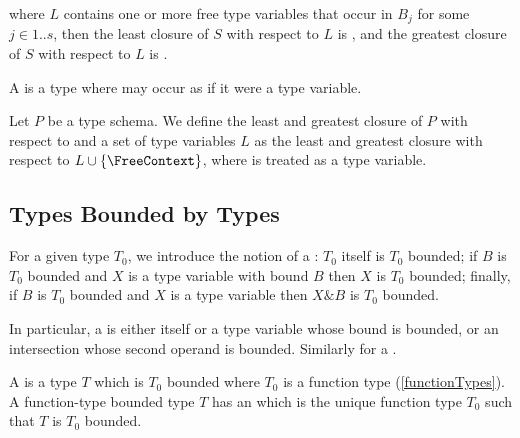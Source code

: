 \documentclass[makeidx]{article}
\begin{document}
\begin{itemize}
  \noindent

  \noindent

  \noindent
  where $L$ contains one or more free type variables that occur in $B_j$
  for some $j \in 1 .. s$,
  then the least closure of $S$ with respect to $L$ is ,
  and the greatest closure of $S$ with respect to $L$ is \FUNCTION.
\end{itemize}

\LMHash{}%
A  is a type where
\FreeContext{} may occur as if it were a type variable.


\LMHash{}%
Let $P$ be a type schema.
We define the least and greatest closure of $P$
with respect to \FreeContext{} and a set of type variables $L$ as
the least and greatest closure with respect to $L \cup \{\FreeContext\}$,
where \FreeContext{} is treated as a type variable.



\subsection{Types Bounded by Types}

\LMHash{}%
For a given type $T_0$, we introduce the notion of a
:
$T_0$ itself is $T_0$ bounded;
if $B$ is $T_0$ bounded and
$X$ is a type variable with bound $B$
then $X$ is $T_0$ bounded;
finally, if $B$ is $T_0$ bounded and
$X$ is a type variable
then $X \& B$ is $T_0$ bounded.

\LMHash{}%
In particular, a
is either \DYNAMIC{} itself
or a type variable whose bound is \DYNAMIC{} bounded,
or an intersection whose second operand is \DYNAMIC{} bounded.
Similarly for a
.

\LMHash{}%
A
is a type $T$ which is $T_0$ bounded where $T_0$ is a function type
(\ref{functionTypes}).
A function-type bounded type $T$ has an
which is the unique function type $T_0$ such that $T$ is $T_0$ bounded.
\end{document}

